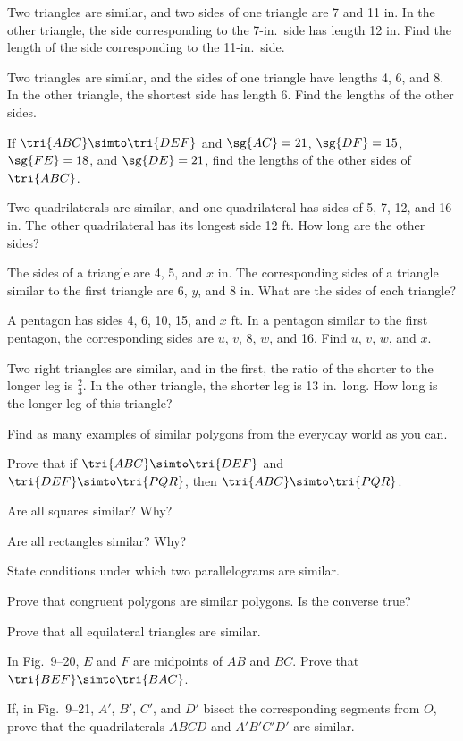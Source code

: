 \documentclass[11pt]{book}
\theoremstyle{bkplain}
\theoremstyle{XIplainnote}
\theoremstyle{bkplain}
\theoremstyle{bkplain}
\begin{document}
\begin{exercisecols}
\begin{exlist}
\item Two triangles are similar, and two sides of one triangle are 7 and 11 in.
      In the other triangle, the side corresponding to the 7-in.\ side has length
      12 in. Find the length of the side corresponding to the 11-in.\ side.
\item Two triangles are similar, and the sides of one triangle have lengths 4, 6,
      and 8. In the other triangle, the shortest side has length 6. Find the
      lengths of the other sides.
\item If $\tri{ABC} \simto \tri{DEF}$ and $\sg{AC} = 21$, $\sg{DF} = 15$,
      $\sg{FE} = 18$, and $\sg{DE} = 21$, find the lengths of the other sides of
      $\tri{ABC}$.
\item Two quadrilaterals are similar, and one quadrilateral has sides of 5, 7,
      12, and 16 in. The other quadrilateral has its longest side 12 ft. How long
      are the other sides?
\item The sides of a triangle are 4, 5, and $x$ in. The corresponding sides of a
      triangle similar to the first triangle are 6, $y$, and 8 in. What are the
      sides of each triangle?
\item A pentagon has sides 4, 6, 10, 15, and $x$ ft. In a pentagon similar to the
      first pentagon, the corresponding sides are $u$, $v$, 8, $w$, and 16. Find
      $u$, $v$, $w$, and $x$.
\item Two right triangles are similar, and in the first, the ratio of the shorter
      to the longer leg is $\frac{2}{3}$. In the other triangle, the shorter leg
      is 13 in.\ long. How long is the longer leg of this triangle?
\item Find as many examples of similar polygons from the everyday world as you
      can.
\item Prove that if $\tri{ABC} \simto \tri{DEF}$ and $\tri{DEF} \simto
      \tri{PQR}$, then $\tri{ABC} \simto \tri{PQR}$.
\item Are all squares similar? Why?
\item Are all rectangles similar? Why?
\item State conditions under which two parallelograms are similar.
\item Prove that congruent polygons are similar polygons. Is the converse true?
\item Prove that all equilateral triangles are similar.
\item In Fig.~9--20, $E$ and $F$ are midpoints of $AB$ and $BC$. Prove that
      $\tri{BEF} \simto \tri{BAC}$.
\exfig{\FIGIXTWENTY}
\item If, in Fig.~9--21, $A'$, $B'$, $C'$, and $D'$ bisect the corresponding
      segments from $O$, prove that the quadrilaterals $ABCD$ and $A'B'C'D'$ are
      similar.
\exfig{\FIGIXTWENTYONE}
\end{exlist}
\end{exercisecols}
\end{document}
